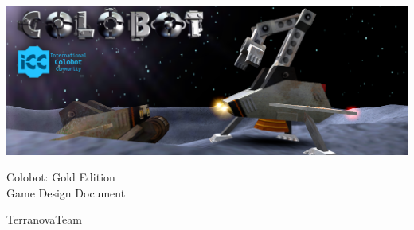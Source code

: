 
\begin{titlepage}
\begin{center}

\vspace*{5cm}

\includegraphics[width=\textwidth]{resources/intro-image}

\vspace{3cm}

{ \Huge Colobot: Gold Edition\\[0.75cm] Game Design Document }

\vspace{1.5cm}

{ \Large TerranovaTeam }

\end{center}
\end{titlepage}
